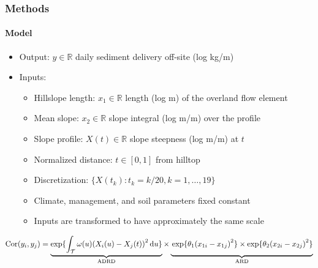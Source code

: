 \documentclass{snedecorbeamer}
\begin{document}
\begin{frame}
  \frametitle{Methods}
  \framesubtitle{Model}

  \begin{itemize}
  \item Output: $y\in\mathbb{R}$ daily sediment delivery off-site (log kg/m)
  \item Inputs:
    \begin{itemize}
    \item Hillslope length: $x_1\in\mathbb{R}$ length (log m) of the overland flow
      element
    \item Mean slope: $x_2\in\mathbb{R}$ slope integral (log m/m) over the profile
    \item Slope profile: $X(t)\in\mathbb{R}$ slope steepness (log m/m) at $t$
    \item Normalized distance: $t\in[0, 1]$ from hilltop
    \item Discretization: $\{X(t_k) : t_k = k / 20, k = 1, \dots, 19\}$
    \item Climate, management, and soil parameters fixed constant
    \item Inputs are transformed to have approximately the same scale
    \end{itemize}
  \end{itemize}

  \vfill

  $\mathrm{Cor}(y_i, y_j) =
  \underbrace{\exp\{
    \int_\mathcal{T}
    \omega(u){(X_i(u) - X_j(t))}^2\,\mathrm{d}u\}
  }_{\mathrm{ADRD}}
  \times
  \underbrace{
    \vphantom{\int_\mathcal{T}}
      \exp\{\theta_1 {(x_{1i} - x_{1j})}^2\}
  \times
  \exp\{\theta_2 {(x_{2i} - x_{2j})}^2\}
  }_{\mathrm{ARD}}$
\end{frame}
\end{document}
